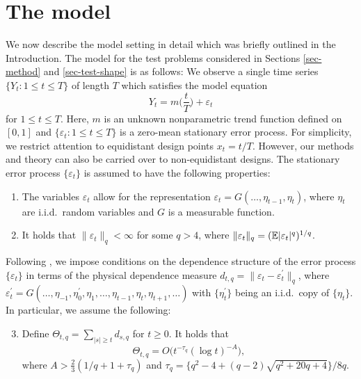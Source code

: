 
\section{The model}\label{sec-model}


We now describe the model setting in detail which was briefly outlined in the Introduction. The model for the test problems considered in Sections \ref{sec-method} and \ref{sec-test-shape} is as follows: We observe a single time series $\{Y_t: 1 \le t \le T \}$ of length $T$ which satisfies the model equation 
\begin{equation}\label{model1}
Y_t = m \Big( \frac{t}{T} \Big) + \varepsilon_t 
\end{equation}
for $1 \le t \le T$. Here, $m$ is an unknown nonparametric trend function defined on $[0,1]$ and $\{ \varepsilon_t: 1 \le t \le T \}$ is a zero-mean stationary error process. For simplicity, we restrict attention to equidistant design points $x_t = t/T$. However, our methods and theory can also be carried over to non-equidistant designs. The stationary error process $\{\varepsilon_t\}$ is assumed to have the following properties: 
\begin{enumerate}[label=(C\arabic*),leftmargin=1.05cm]

\item \label{C-err1} The variables $\varepsilon_t$ allow for the representation $\varepsilon_t = G(\ldots,\eta_{t-1},\eta_t)$, where $\eta_t$ are i.i.d.\ random variables and $G$ is a measurable function. 

\item \label{C-err2} It holds that $\| \varepsilon_t \|_q < \infty$ for some $q > 4$, where $\| \varepsilon_t \|_q = (\mathbb{E}|\varepsilon_t|^q)^{1/q}$. 

\end{enumerate}
Following \cite{Wu2005}, we impose conditions on the dependence structure of the error process $\{\varepsilon_t\}$ in terms of the physical dependence measure $d_{t,q} = \| \varepsilon_t - \varepsilon_t^\prime \|_q$, where $\varepsilon_t^\prime = G(\ldots,\eta_{-1},\eta_0^\prime,\eta_1,\ldots,\eta_{t-1},\eta_t,\eta_{t+1},\ldots)$ with $\{\eta_t^\prime\}$ being an i.i.d.\ copy of $\{\eta_t\}$. In particular, we assume the following: 
\begin{enumerate}[label=(C\arabic*),leftmargin=1.05cm]
\setcounter{enumi}{2}

\item \label{C-err3} Define $\Theta_{t,q} = \sum\nolimits_{|s| \ge t} d_{s,q}$ for $t \ge 0$. It holds that 
\[ \Theta_{t,q} = O \big( t^{-\tau_q} (\log t)^{-A} \big), \]
where $A > \frac{2}{3} (1/q + 1 + \tau_q)$ and $\tau_q = \{q^2 - 4 + (q-2) \sqrt{q^2 + 20q + 4}\} / 8q$. 

\end{enumerate}
